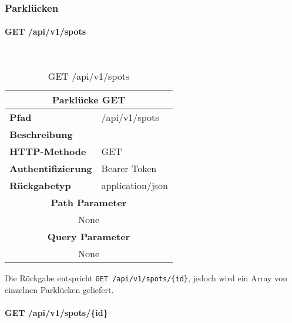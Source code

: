 \subsubsection{Parklücken}
\paragraph{GET /api/v1/spots}\mbox{}\\

\begin{table}[H]
  \centering
  \begin{tabular}{|l|l|}
  \hline
  \multicolumn{2}{|c|}{\textbf{Parklücke GET}} \\ \hline
  \textbf{Pfad}                & /api/v1/spots  \\ \hline
  \textbf{Beschreibung}        &                     \\ \hline
  \textbf{HTTP-Methode}        & GET                 \\ \hline
  \textbf{Authentifizierung}   & Bearer Token        \\ \hline
  \textbf{Rückgabetyp}         & application/json    \\ \hline
  \multicolumn{2}{|c|}{\textbf{Path Parameter}}                      \\ \hline
  \multicolumn{2}{|c|}{None}          \\ \hline
  \multicolumn{2}{|c|}{\textbf{Query Parameter}}                      \\ \hline
  \multicolumn{2}{|c|}{None}          \\ \hline
  \end{tabular}
  \caption{GET /api/v1/spots}
\end{table}

Die Rückgabe entspricht \verb|GET /api/v1/spots/{id}|, jedoch wird ein
Array von einzelnen Parklücken geliefert.

\paragraph{GET /api/v1/spots/\{id\}}\mbox{}\\

